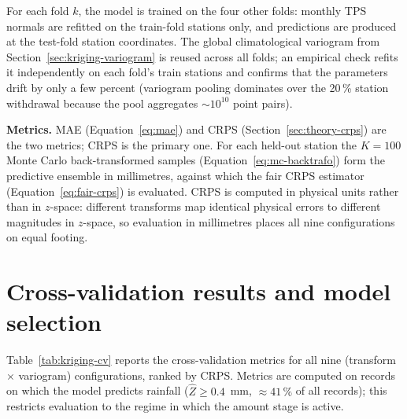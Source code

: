 For each fold $k$, the model is trained on the four other folds: monthly
TPS normals are refitted on the train-fold stations only, and predictions
are produced at the test-fold station coordinates. The global
climatological variogram from Section~\ref{sec:kriging-variogram} is
reused across all folds; an empirical check refits it independently on
each fold's train stations and confirms that the parameters drift by only
a few percent (variogram pooling dominates over the 20\,\% station
withdrawal because the pool aggregates ${\sim}10^{10}$ point pairs).

\textbf{Metrics.}
MAE (Equation~\eqref{eq:mae}) and CRPS (Section~\ref{sec:theory-crps}) are
the two metrics; CRPS is the primary one. For each held-out station the
$K = 100$ Monte Carlo back-transformed samples (Equation~\eqref{eq:mc-backtrafo})
form the predictive ensemble in millimetres, against which the fair CRPS
estimator (Equation~\eqref{eq:fair-crps}) is evaluated.
CRPS is computed in physical units rather than in $z$-space: different
transforms map identical physical errors to different magnitudes in
$z$-space, so evaluation in millimetres places all nine configurations
on equal footing.

\section{Cross-validation results and model selection}
\label{sec:kriging-evaluation}

Table~\ref{tab:kriging-cv} reports the cross-validation metrics for all
nine (transform $\times$ variogram) configurations, ranked by CRPS.
Metrics are computed on records on which the model predicts rainfall
($\hat{Z} \ge 0{.}4$~mm, $\approx 41\,\%$ of all records); this restricts
evaluation to the regime in which the amount stage is active.

